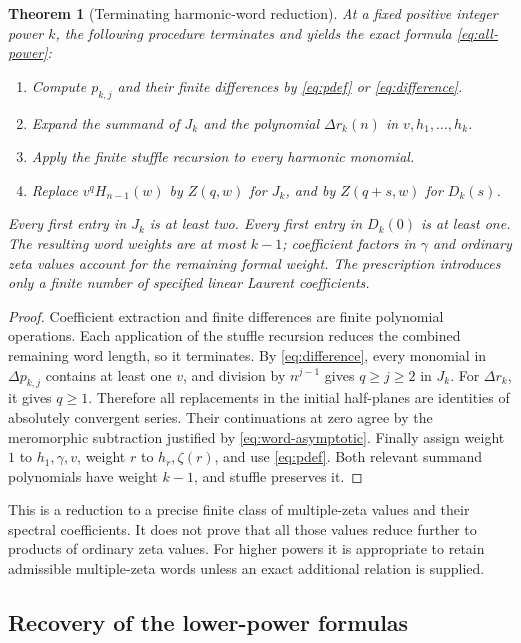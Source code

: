 \documentclass[11pt,a4paper]{article}
\numberwithin{equation}{section}
\newtheorem{theorem}{Theorem}[section]
\theoremstyle{definition}
\theoremstyle{remark}
\begin{document}
\begin{theorem}[Terminating harmonic-word reduction]
\label{thm:algorithm}
At a fixed positive integer power $k$, the following procedure terminates
and yields the exact formula \eqref{eq:all-power}:
\begin{enumerate}
\item Compute $p_{k,j}$ and their finite differences by
\eqref{eq:pdef} or \eqref{eq:difference}.
\item Expand the summand of $J_k$ and the polynomial $\Delta r_k(n)$
in $v,h_1,\ldots,h_k$.
\item Apply the finite stuffle recursion to every harmonic monomial.
\item Replace $v^qH_{n-1}(w)$ by $Z(q,w)$ for $J_k$, and by
$Z(q+s,w)$ for $D_k(s)$.
\end{enumerate}
Every first entry in $J_k$ is at least two.  Every first entry in
$D_k(0)$ is at least one.  The resulting word weights are at most
$k-1$; coefficient factors in $\gamma$ and ordinary zeta values account
for the remaining formal weight.  The prescription introduces only a
finite number of specified linear Laurent coefficients.
\end{theorem}

\begin{proof}
Coefficient extraction and finite differences are finite polynomial
operations.  Each application of the stuffle recursion reduces the
combined remaining word length, so it terminates.  By
\eqref{eq:difference}, every monomial in $\Delta p_{k,j}$ contains
at least one $v$, and division by $n^{j-1}$ gives $q\ge j\ge2$
in $J_k$.  For $\Delta r_k$, it gives $q\ge1$.  Therefore all
replacements in the initial half-planes are identities of absolutely
convergent series.  Their continuations at zero agree by the
meromorphic subtraction justified by \eqref{eq:word-asymptotic}.
Finally assign weight $1$ to $h_1,\gamma,v$, weight $r$ to
$h_r,\zeta(r)$, and use \eqref{eq:pdef}.  Both relevant summand
polynomials have weight $k-1$, and stuffle preserves it.
\end{proof}

This is a reduction to a precise finite class of multiple-zeta values
and their spectral coefficients.  It does not prove that all those
values reduce further to products of ordinary zeta values.  For higher
powers it is appropriate to retain admissible multiple-zeta words
unless an exact additional relation is supplied.

\subsection{Recovery of the lower-power formulas}
\end{document}
